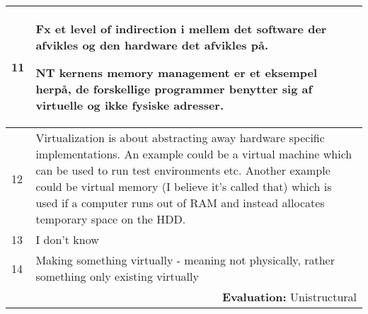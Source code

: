 \begin{longtable}{|p{0.3cm}|p{14.7cm}|}
11 & Fx et level of indirection i mellem det software der afvikles og den hardware det afvikles på. 

\noindent NT kernens memory management er et eksempel herpå, de forskellige programmer benytter sig af virtuelle og ikke fysiske adresser. \\ \hline

12 & Virtualization is about abstracting away hardware specific implementations. An example could be a virtual machine which can be used to run test environments etc. Another example could be virtual memory (I believe it's called that) which is used if a computer runs out of RAM and instead allocates temporary space on the HDD.\\ \hline

13 & I don't know \\ \hline

14 & Making something virtually - meaning not physically, rather something only existing virtually \\ \hline

\multicolumn{2}{r}{\textbf{Evaluation:} Unistructural} \\ 

\end{longtable}
\normalsize


